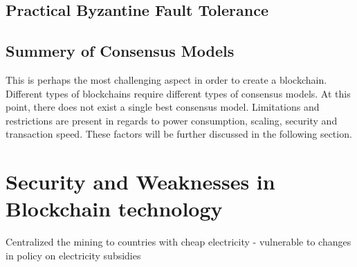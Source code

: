 
\subsection{Practical Byzantine Fault Tolerance} 
 
 \subsection{Summery of Consensus Models}
This is perhaps the most challenging aspect in order to create a blockchain. Different types of blockchains require different types of consensus models.  
At this point, there does not exist a single best consensus model. Limitations and restrictions are present in regards to power consumption, scaling, security and transaction speed. These factors will be further discussed in the following section. 

\section{Security and Weaknesses in Blockchain technology}


Centralized the mining to countries with cheap electricity - vulnerable to changes in policy on electricity subsidies %



